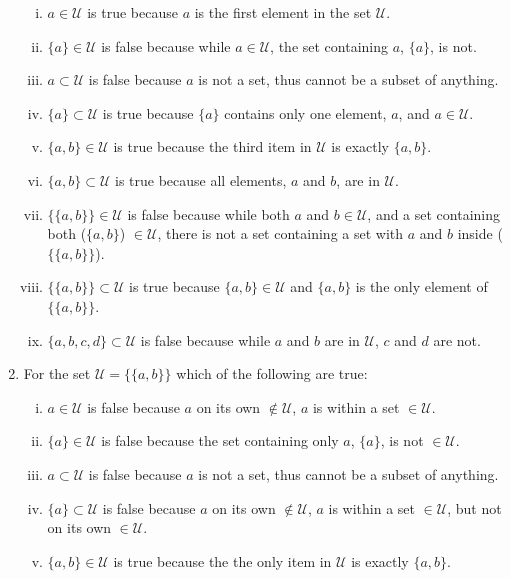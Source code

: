 \documentclass{article}
\begin{document}
\begin{enumerate}[1]
\begin{enumerate}[i.]
        \item $a \in \mathscr{U}$ is true because $a$ is the first element in the set $\mathscr{U}$.
        \item $\{a\} \in \mathscr{U}$ is false because while $a \in \mathscr{U}$, the set containing $a$, $\{a\}$, is not.
        \item $a \subset \mathscr{U}$ is false because $a$ is not a set, thus cannot be a subset of anything.
        \item $\{a\} \subset \mathscr{U}$ is true because $\{a\}$ contains only one element, $a$, and $a \in \mathscr{U}$.
        \item $\{a, b\} \in \mathscr{U}$ is true because the third item in $\mathscr{U}$ is exactly $\{a, b\}$.
        \item $\{a, b\} \subset \mathscr{U}$ is true because all elements, $a$ and $b$, are in $\mathscr{U}$.
        \item $\{\{a,b\}\} \in \mathscr{U}$ is false because while both $a$ and $b \in \mathscr{U}$, and a set containing both ($\{a, b\}$) $\in \mathscr{U}$, there is not a set containing a set with $a$ and $b$ inside ($\{\{a, b\}\}$).
        \item $\{\{a,b\}\} \subset \mathscr{U}$ is true because $\{a, b\} \in \mathscr{U}$ and  $\{a, b\}$ is the only element of $\{\{a,b\}\}$.
        \item $\{a, b, c, d\} \subset \mathscr{U}$ is false because while $a$ and $b$ are in $\mathscr{U}$, $c$ and $d$ are not. 
    \end{enumerate}
    \setcounter{enumi}{4}
    \item For the set $\mathscr{U} = \{\{a, b\}\}$ which of the following are true:
    \begin{enumerate}[i.]
        \item $a \in \mathscr{U}$ is false because $a$ on its own $\notin \mathscr{U}$, $a$ is within a set $\in \mathscr{U}$.
        \item $\{a\} \in \mathscr{U}$ is false because the set containing only $a$, $\{a\}$, is not $\in \mathscr{U}$. 
        \item $a \subset \mathscr{U}$ is false because $a$ is not a set, thus cannot be a subset of anything.
        \item $\{a\} \subset \mathscr{U}$ is false because $a$ on its own $\notin \mathscr{U}$, $a$ is within a set $\in \mathscr{U}$, but not on its own $\in \mathscr{U}$.
        \item $\{a, b\} \in \mathscr{U}$ is true because the the only item in $\mathscr{U}$ is exactly $\{a, b\}$.

\end{enumerate}
\end{enumerate}
\end{document}
